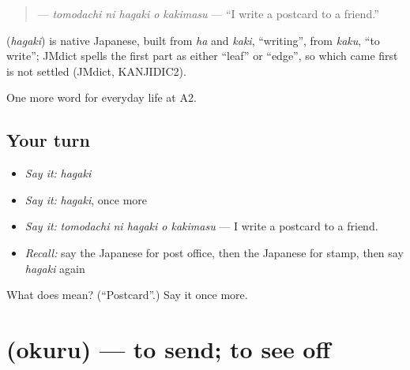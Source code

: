 \begin{quote}
\textbf{  } — \emph{tomodachi ni hagaki o kakimasu} — \textquotedblleft{}I write a postcard to a friend.\textquotedblright{}
\end{quote}

\begin{cousinweb}
\textbf{} (\emph{hagaki}) is native Japanese, built from \emph{ha} and \emph{kaki}, \textquotedblleft{}writing\textquotedblright{}, from \emph{kaku}, \textquotedblleft{}to write\textquotedblright{}; JMdict spells the first part as either \textquotedblleft{}leaf\textquotedblright{} or \textquotedblleft{}edge\textquotedblright{}, so which came first is not settled (JMdict, KANJIDIC2).
\end{cousinweb}

\begin{grammarlens}[title={What you've built}]
One more word for everyday life at A2.
\end{grammarlens}

\subsection*{Your turn}
\begin{itemize}
\raggedright
  \item \emph{Say it:} \emph{hagaki}
  \item \emph{Say it:} \emph{hagaki}, once more
  \item \emph{Say it:} \emph{tomodachi ni hagaki o kakimasu} — I write a postcard to a friend.
  \item \emph{Recall:} say the Japanese for post office, then the Japanese for stamp, then say \emph{hagaki} again
\end{itemize}

\begin{tcolorbox}[breakable,colback=teal!4,colframe=teal!35!black,title={Before you move on}]
What does  mean? (\textquotedblleft{}Postcard\textquotedblright{}.) Say it once more.
\end{tcolorbox}
\section[\texorpdfstring{\ja{おくる} (okuru)}{おくる (okuru)}]{ (okuru) — to send; to see off}

\label{lesson:JA-C188-okuru}



